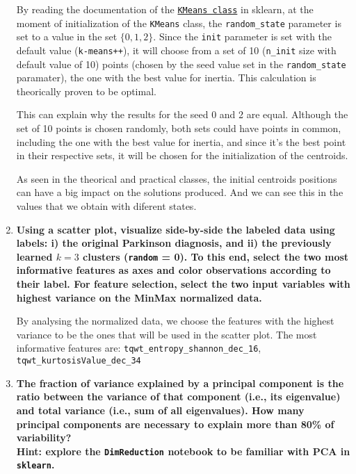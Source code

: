 \documentclass[12pt]{article}
\begin{document}
\begin{enumerate}[leftmargin=\labelsep]
          By reading the documentation of the \href{https://scikit-learn.org/stable/modules/generated/sklearn.cluster.KMeans.html}{\texttt{KMeans class}}
          in sklearn, at the moment of initialization of the \texttt{KMeans} class,
          the \texttt{random\_state} parameter is set to a value in the set $\{0,1,2\}$.
          Since the \texttt{init} parameter is set with the default value (\texttt{k-means++}),
          it will choose from a set of 10 (\texttt{n\_init} size with default value of 10) points (chosen by the seed value set in the \texttt{random\_state} paramater),
          the one with the best value for inertia. This calculation is theorically proven to be optimal.

          This can explain why the results for the seed 0 and 2 are equal.
          Although the set of 10 points is chosen randomly, both sets could have points in common,
          including the one with the best value for inertia, and since it's the best point in their respective sets, it will be chosen for the initialization of the centroids.

          As seen in the theorical and practical classes, the initial centroids positions can have a big impact on the solutions produced.
          And we can see this in the values that we obtain with diferent states.

    \item {\color{questioncolor}\bfseries
          Using a scatter plot, visualize side-by-side the labeled data using labels:
          i) the original Parkinson diagnosis, and ii) the previously learned $k = 3$
          clusters (\texttt{random} = 0).
          To this end, select the two most informative features as axes and color
          observations according to their label.
          For feature selection, select the two input variables with highest
          variance on the MinMax normalized data.
          }\\
          \vspace{0.5em}

          By analysing the normalized data, we choose the features with the highest variance to be the ones that will be used in the scatter plot.
          The most informative features are: \texttt{tqwt\_entropy\_shannon\_dec\_16}, \texttt{tqwt\_kurtosisValue\_dec\_34}

    \item {\color{questioncolor}\bfseries
          The fraction of variance explained by a principal component is the ratio
          between the variance of that component (i.e., its eigenvalue) and total
          variance (i.e., sum of all eigenvalues).
          How many principal components are necessary to explain more than 80\%
          of variability?\\
          Hint: explore the \texttt{DimReduction} notebook to be familiar
          with PCA in \texttt{sklearn}.
          }\\
          \vspace{0.5em}


\end{enumerate}
\end{document}
